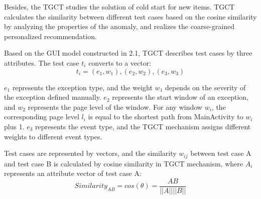 Besides, the TGCT studies the solution of cold start for new items. TGCT calculates the similarity between different test cases based on the cosine similarity by analyzing the properties of the anomaly, and realizes the coarse-grained personalized recommendation.

Based on the GUI model constructed in 2.1, TGCT describes test cases by three attributes. The test case $t_{i}$ converts to a vector:
\begin{equation}
t_{i} = {(e_{1}, w_{1}),(e_{2}, w_{2}),(e_{3}, w_{3})}
\end{equation}

$e_{1}$ represents the exception type, and the weight $w_{1}$ depends on the severity of the exception defined manually. $e_{2}$ represents the start window of an exception, and $w_{2}$ represents the page level of the window. For any window $w_{i}$, the corresponding page level $l_{i}$ is equal to the shortest path from MainActivity to $w_{i}$ plus 1.
$e_{3}$ represents the event type, and the TGCT mechanism assigns different weights to different event types.

Test cases are represented by vectors, and the similarity $w_{ij}$ between test case A and test case B is calculated by cosine similarity in TGCT mechanism, where $A_{i}$ represents an attribute vector of test case A:
\begin{equation}
Similarity_{AB} = cos(\theta) = \frac{AB}{||A||||B||}
\end{equation}

